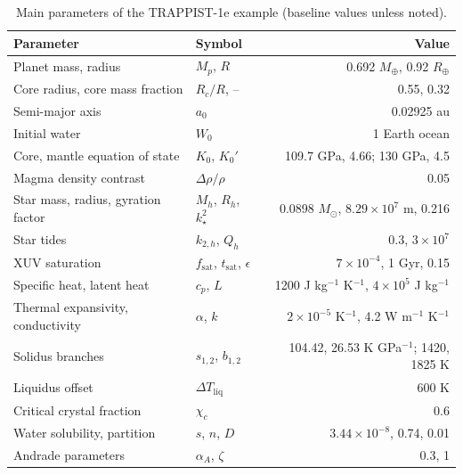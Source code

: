 \documentclass[11pt]{article}
\begin{document}
\begin{table}[h]
\centering
\caption{Main parameters of the TRAPPIST-1e example (baseline values unless noted).}\label{tab:params}
\begin{tabular}{llr}
\toprule
Parameter & Symbol & Value \\
\midrule
Planet mass, radius & $M_p$, $R$ & 0.692 $M_\oplus$, 0.92 $R_\oplus$ \\
Core radius, core mass fraction & $R_c / R$, -- & 0.55, 0.32 \\
Semi-major axis & $a_0$ & 0.02925 au \\
Initial water & $W_0$ & 1 Earth ocean \\
Core, mantle equation of state & $K_0$, $K_0'$ & 109.7 GPa, 4.66; 130 GPa, 4.5 \\
Magma density contrast & $\Delta\rho / \rho$ & 0.05 \\
Star mass, radius, gyration factor & $M_h$, $R_h$, $k_\star^2$ & 0.0898 $M_\odot$, $8.29 \times 10^7$ m, 0.216 \\
Star tides & $k_{2,h}$, $Q_h$ & 0.3, $3 \times 10^7$ \\
XUV saturation & $f_\mathrm{sat}$, $t_\mathrm{sat}$, $\epsilon$ & $7 \times 10^{-4}$, 1 Gyr, 0.15 \\
Specific heat, latent heat & $c_p$, $L$ & 1200 J kg$^{-1}$ K$^{-1}$, $4 \times 10^5$ J kg$^{-1}$ \\
Thermal expansivity, conductivity & $\alpha$, $k$ & $2 \times 10^{-5}$ K$^{-1}$, 4.2 W m$^{-1}$ K$^{-1}$ \\
Solidus branches & $s_{1,2}$, $b_{1,2}$ & 104.42, 26.53 K GPa$^{-1}$; 1420, 1825 K \\
Liquidus offset & $\Delta T_\mathrm{liq}$ & 600 K \\
Critical crystal fraction & $\chi_c$ & 0.6 \\
Water solubility, partition & $s$, $n$, $D$ & $3.44 \times 10^{-8}$, 0.74, 0.01 \\
Andrade parameters & $\alpha_A$, $\zeta$ & 0.3, 1 \\
\bottomrule
\end{tabular}
\end{table}
\end{document}
